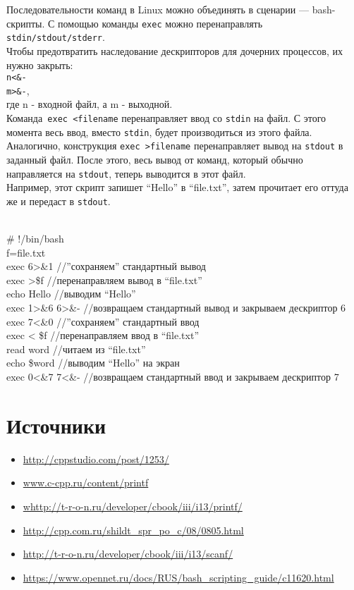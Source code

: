 \documentclass {article}
\begin{document}
Последовательности команд в Linux можно объединять в сценарии --- bash-скрипты.
С помощью команды \texttt{exec} можно перенаправлять \texttt{stdin/stdout/stderr}. \\
Чтобы предотвратить наследование дескрипторов для дочерних процессов, их нужно закрыть:\\
\texttt{n<\&- \\ m>\&-},\\ где n - входной файл, а m - выходной.\\
Команда\texttt{ exec <filename} перенаправляет ввод со \texttt{stdin} на файл. С этого момента весь ввод, вместо \texttt{stdin}, будет производиться из этого файла. Аналогично, конструкция \texttt{exec >filename} перенаправляет вывод на \texttt{stdout} в заданный файл. После этого, весь вывод от команд, который обычно направляется на \texttt{stdout}, теперь выводится в этот файл.\\
Например, этот скрипт запишет ``Hello'' в ``file.txt'', затем прочитает его оттуда же и передаст в \texttt{stdout}.\\ \\
\begin{tt}
\# !/bin/bash\\
f=file.txt\\
exec 6>\&1		//''сохраняем'' стандартный вывод\\
exec >\$f 			//перенаправляем вывод в ``file.txt''\\
echo Hello			//выводим ``Hello''\\
exec 1>\&6 6>\&- 	//возвращаем стандартный вывод и закрываем дескриптор 6\\
exec 7<\&0		//''сохраняем'' стандартный ввод\\
exec < \$f		//перенаправляем ввод в ``file.txt''\\
read word 			//читаем из ``file.txt''\\
echo \$word		//выводим ``Hello'' на экран\\
exec 0<\&7 7<\&- 		//возвращаем стандартный ввод и закрываем дескриптор 7\\
\end{tt}
\newline
\section{Источники}
\begin{itemize}
\item \url{http://cppstudio.com/post/1253/}
\item \url{www.c-cpp.ru/content/printf}
\item \url{whttp://t-r-o-n.ru/developer/cbook/iii/i13/printf/}
\item \url{http://cpp.com.ru/shildt_spr_po_c/08/0805.html}
\item \url{http://t-r-o-n.ru/developer/cbook/iii/i13/scanf/}
\item \url{https://www.opennet.ru/docs/RUS/bash_scripting_guide/c11620.html}
\end{itemize}
\newpage
\tableofcontents
\end{document}
